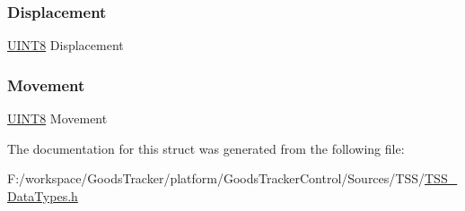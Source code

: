\subsubsection{\texorpdfstring{Displacement}{Displacement}}
{\footnotesize\ttfamily \hyperlink{_t_s_s___data_types_8h_ab27e9918b538ce9d8ca692479b375b6a}{U\+I\+N\+T8} Displacement}

\mbox{\label{struct_t_s_s___m_a_t_r_i_x___d_y_n_aa5fac4f9f3ed46d5688c0b547f0b757e}} 
\subsubsection{\texorpdfstring{Movement}{Movement}}
{\footnotesize\ttfamily \hyperlink{_t_s_s___data_types_8h_ab27e9918b538ce9d8ca692479b375b6a}{U\+I\+N\+T8} Movement}



The documentation for this struct was generated from the following file\+:\begin{DoxyCompactItemize}
\item 
F\+:/workspace/\+Goods\+Tracker/platform/\+Goods\+Tracker\+Control/\+Sources/\+T\+S\+S/\hyperlink{_t_s_s___data_types_8h}{T\+S\+S\+\_\+\+Data\+Types.\+h}\end{DoxyCompactItemize}
